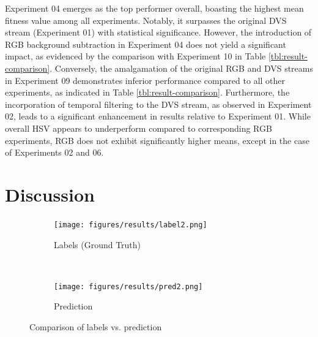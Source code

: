 \documentclass[sigchi,screen]{acmart}
\begin{document}
Experiment 04 emerges as the top performer overall, boasting the highest mean fitness value among all experiments. Notably, it surpasses the original DVS stream (Experiment 01) with statistical significance. However, the introduction of RGB background subtraction in Experiment 04 does not yield a significant impact, as evidenced by the comparison with Experiment 10 in Table \ref{tbl:result-comparison}. Conversely, the amalgamation of the original RGB and DVS streams in Experiment 09 demonstrates inferior performance compared to all other experiments, as indicated in Table \ref{tbl:result-comparison}. Furthermore, the incorporation of temporal filtering to the DVS stream, as observed in Experiment 02, leads to a significant enhancement in results relative to Experiment 01. While overall HSV appears to underperform compared to corresponding RGB experiments, RGB does not exhibit significantly higher means, except in the case of Experiments 02 and 06.

\section{Discussion}
\begin{figure}
    \centering
   \begin{subfigure}{\linewidth}
       \texttt{[image: figures/results/label2.png]}
       \caption{Labels (Ground Truth)}
   \end{subfigure}\\ 
   \begin{subfigure}{\linewidth}
       \texttt{[image: figures/results/pred2.png]}
       \caption{Prediction}
   \end{subfigure}
   \caption{Comparison of labels vs. prediction}
   \label{fig:labelVsPred}
\end{figure}
\end{document}
